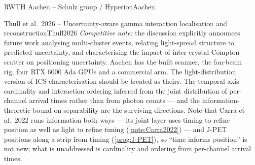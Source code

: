 \begin{programnote}{RWTH Aachen -- Schulz group / Hyperion}{Aachen}
\begin{papernote}{Thull et al.\ 2026 -- Uncertainty-aware gamma interaction localisation and reconstruction}{Thull2026}
\emph{Competitive note:} the discussion explicitly announces future work analysing
multi-cluster events, relating light-spread structure to predicted uncertainty, and
characterising the impact of inter-crystal Compton scatter on positioning uncertainty.
Aachen has the built scanner, the fan-beam rig, four RTX 6000 Ada GPUs and a commercial
arm. The light-distribution version of ICS characterisation should be treated as theirs.
The temporal axis --- cardinality and interaction ordering inferred from the joint
distribution of per-channel arrival times rather than from photon counts --- and the
information-theoretic bound on separability are the surviving directions. Note that
Carra et al.\ 2022 runs information both ways --- its joint layer uses timing to
refine position as well as light to refine timing (\ref{note:Carra2022}) --- and
J-PET positions along a strip from timing (\ref{prog:J-PET}), so ``time informs
position'' is not new; what is unaddressed is cardinality and ordering from
per-channel arrival times.
\end{papernote}
 
\end{programnote}
 
 


